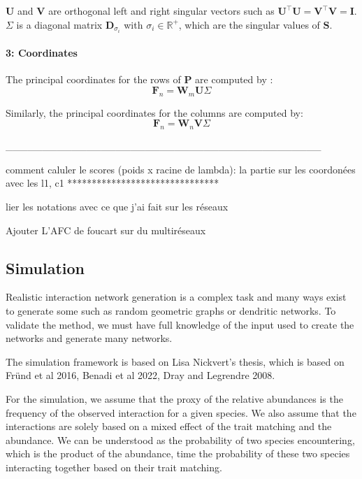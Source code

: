 $\mathbf{U}$ and $\mathbf{V}$ are orthogonal left and right singular vectors such as $\mathbf{U}^\intercal\mathbf{U} = \mathbf{V}^\intercal\mathbf{V} = \mathbf{I}$. $\Sigma$ is a diagonal matrix $\mathbf{D}_{\sigma_i}$ with $\sigma_i \in \mathbb{R}^+$, which are the singular values of $\mathbf{S}$.

\paragraph{3: Coordinates}

The principal coordinates for the rows of $\mathbf{P}$ are computed by :
$$
    \mathbf{F}_n = \mathbf{W}_m \mathbf{U} \Sigma
$$

Similarly, the principal coordinates for the columns are computed by:
$$
    \mathbf{F}_n = \mathbf{W}_n \mathbf{V} \Sigma
$$ 

___________________________________________







comment caluler le scores (poids x racine de lambda): la partie sur les coordonées avec les l1, c1
*******************************


lier les notations avec ce que j'ai fait sur les réseaux

Ajouter L'AFC de foucart sur du multiréseaux

\subsection{Simulation}

Realistic interaction network generation is a complex task and many ways exist to generate some such as random geometric graphs or dendritic networks. To validate the method, we must have full knowledge of the input used to create the networks and generate many networks.

The simulation framework is based on Lisa Nickvert's thesis, which is based on Fründ et al 2016, Benadi et al 2022, Dray and Legrendre 2008.

For the simulation, we assume that the proxy of the relative abundances is the frequency of the observed interaction for a given species. We also assume that the interactions are solely based on a mixed effect of the trait matching and the abundance. We can be understood as the probability of two species encountering, which is the product of the abundance, time the probability of these two species interacting together based on their trait matching.

